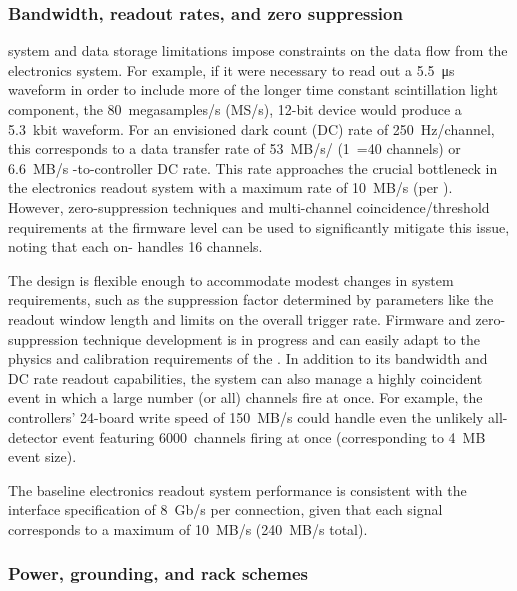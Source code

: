 \subsubsection{Bandwidth, readout rates, and zero suppression}

 system and data storage limitations impose constraints on the  data flow from the  electronics system. 
For example, if it were necessary to read out a \SI{5.5}{\micro\second} waveform in order to include more of the longer time constant scintillation light component, the \SI{80}{megasamples/s} (MS/s), 12-bit  device would produce a \SI{5.3}{kbit} waveform. For an envisioned dark count (DC) rate of 250~Hz/channel, this corresponds to a data transfer rate of \SI{53}{MB/s}/ (1~=40 channels) or \SI{6.6}{MB/s} -to-controller DC rate. This rate approaches the crucial bottleneck in the electronics readout system with a maximum rate of \SI{10}{MB/s} (per ). However, zero-suppression techniques and multi-channel coincidence/threshold requirements at the  firmware level can be used to significantly mitigate this issue, noting that each on-  handles 16 channels. 

The design is flexible enough to accommodate modest changes in system requirements, such as the suppression factor determined by parameters like the readout window length and limits on the overall trigger rate. 
Firmware and zero-suppression technique development is in progress and can easily adapt to the physics and calibration requirements of the .
In addition to its bandwidth and DC rate readout capabilities, the system can also  manage a highly coincident event in which a large number (or all) channels fire at once. 
For example, the controllers' 24-board write speed of \SI{150}{MB/s} could handle even the unlikely all-detector event featuring 6000~channels firing at once (corresponding to \SI{4}{MB} event size). 

The baseline electronics readout system performance is consistent with the  interface specification of \SI{8}{Gb/s} per connection, given that
each  signal corresponds to a maximum of \SI{10}{MB/s} (\SI{240}{MB/s} total).  

\subsubsection{Power, grounding, and rack schemes} 

